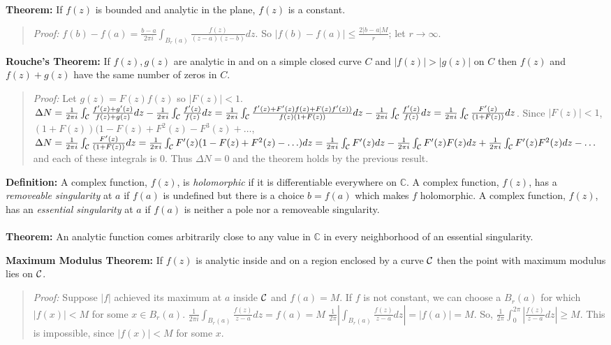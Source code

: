 {\bf Theorem:} If $f(z)$ is bounded and analytic in the plane, $f(z)$ is a constant.
\begin{quote}
\emph{Proof:}
$f(b) - f(a) = {\frac {b-a} {2 \pi i}} \int_{B_r(a)} {\frac {f(z)} {(z-a)(z-b)}} dz$.
So $|f(b) - f(a)| \leq {\frac {2|b-a| M} {r}}$; let $r \rightarrow \infty$.
\end{quote}
{\bf Rouche's Theorem:} If $f(z), g(z)$ are analytic 
in and on a simple closed curve $C$
and $|f(z)|>|g(z)|$ on $C$ then
$f(z)$ and $f(z)+g(z)$ have the same number of zeros in $C$.
\begin{quote}
\emph{Proof:}
Let $g(z)= F(z)f(z)$ so $|F(z)|<1$.
$\Delta N= 
{\frac 1 {2 \pi i}} \int_{\cal C} {\frac {f'(z)+g'(z)} {f(z)+g(z)}} dz -
{\frac 1 {2 \pi i}} \int_{\cal C} {\frac {f'(z)} {f(z)}} dz=
{\frac 1 {2 \pi i}} \int_{\cal C} {\frac {f'(z)+F'(z)f(z)+F(z)f'(z))} {f(z)(1+F(z))}} dz-
{\frac 1 {2 \pi i}} \int_{\cal C} {\frac {f'(z)} {f(z)}} dz=
{\frac 1 {2 \pi i}} \int_{\cal C} {\frac {F'(z)} {(1+F(z))}} dz$.  Since
$|F(z)|<1$, $(1+F(z))(1-F(z)+F^2(z)-F^3(z)+ \ldots $,
$\Delta N= 
{\frac 1 {2 \pi i}} \int_{\cal C} {\frac {F'(z)} {(1+F(z))}} dz=
{\frac 1 {2 \pi i}} \int_{\cal C} F'(z) (1-F(z)+F^2(z)- \ldots) dz=
{\frac 1 {2 \pi i}} \int_{\cal C} F'(z)  dz-
{\frac 1 {2 \pi i}} \int_{\cal C} F'(z) F(z) dz+
{\frac 1 {2 \pi i}} \int_{\cal C} F'(z) F^2(z) dz- \ldots
$ and each of these integrals is $0$.  Thus $\Delta N= 0$ and the theorem holds by
the previous result.
\end{quote}
{\bf Definition:}  A complex function, $f(z)$, is \emph{holomorphic} if it is
differentiable everywhere on ${\mathbb C}$.
A complex function, $f(z)$, has a \emph{removeable singularity} at
$a$ if $f(a)$ is undefined but there is a choice $b=f(a)$ which makes $f$ holomorphic.
A complex function, $f(z)$, has an \emph{essential singularity} at $a$ if $f(a)$ is neither
a pole nor a removeable singularity.
\\
\\
{\bf Theorem:}  
An analytic function comes arbitrarily close to any value in ${\mathbb C}$ in every neighborhood of an
essential singularity.
\begin{quote}
\end{quote}
{\bf Maximum Modulus Theorem:} If $f(z)$ is analytic inside and on a region enclosed by a curve
${\cal C}$ then the point with maximum modulus lies on ${\cal C}$.
\begin{quote}
\emph{Proof:}
Suppose $|f|$ achieved its maximum at $a$ inside ${\cal C}$ and $f(a) = M$. If $f$ is not
constant, we can choose a $B_r(a)$ for which $|f(x)| < M$ for some $x \in B_r(a)$.
${\frac 1 {2 \pi i}} \int_{B_r(a)} {\frac {f(z)}{z-a}} dz = f(a) = M$
${\frac 1 {2 \pi}} |\int_{B_r(a)} {\frac {f(z)}{z-a}} dz| = |f(a)| = M$. So,
${\frac 1 {2 \pi}} \int_{0}^{2 \pi} |{\frac {f(z)}{z-a}} dz| \geq  M$. This is impossible,
since $|f(x)| < M$ for some $x$.
\end{quote}

